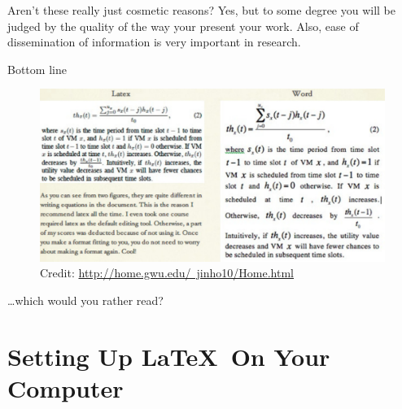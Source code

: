 \documentclass[]{beamer}
\begin{document}
\begin{frame}{Aren't these really just cosmetic reasons?}
Yes, but to some degree you will be judged by the quality of the way your present your work. Also, ease of dissemination of information is very important in research.
	\begin{block}{Bottom line}
\begin{figure}[h!tbp]
\centering
\includegraphics[scale=0.30]{latex_word_compare.pdf}
\caption{Credit: \href{http://home.gwu.edu/~jinho10/CS_Tips/Entries/2012/1/2_Latex_Tips.html}{\tiny http://home.gwu.edu/~jinho10/Home.html}}
\end{figure}
	\end{block}
\ldots which would you rather read?
\end{frame}


\section{Setting Up \LaTeX~On Your Computer}
\end{document}
